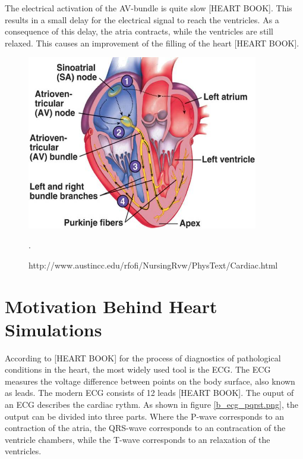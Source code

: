The electrical activation of the AV-bundle is quite slow [HEART BOOK]. This results in a small delay for the electrical signal to reach the ventricles. As a consequence of this delay, the atria contracts, while the ventricles are still relaxed. This causes an improvement of the filling of the heart [HEART BOOK].


\begin{figure}[h]
 \centering 
     \includegraphics[width=0.9\textwidth]{bilder/b_electrical_heart}
     \caption{http://www.austincc.edu/rfofi/NursingRvw/PhysText/Cardiac.html}.
     \label{b_electrical_heart.png}
\end{figure}

\section{Motivation Behind Heart Simulations}
According to [HEART BOOK]
for the process of diagnostics of pathological conditions in the heart, the most widely used tool is the ECG. The ECG measures the voltage difference between points on the body surface, also known as leads. The modern ECG consists of 12 leads [HEART BOOK]. The ouput of an ECG describes the cardiac rythm. As shown in figure \ref{b_ecg_pqrst.png}, the output can be divided into three parts.
Where the P-wave corresponds to an contraction of the atria, the QRS-wave corresponds to an contracation of the ventricle chambers, while the T-wave corresponds to an relaxation of the ventricles. %

